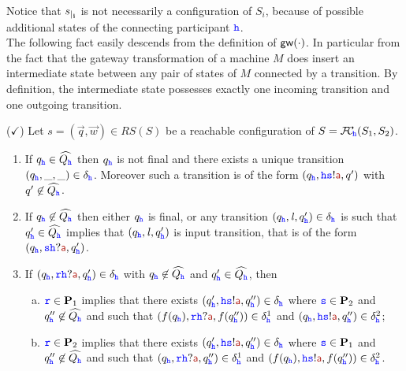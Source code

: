 Notice that ${s}_{\mid_{\mathbf{i}}}$ is not necessarily a configuration of $S_i$, because of possible additional states of the connecting participant ${\mathtt{\color{blue}{ {h}}}}$.\\


The following fact easily descends from the definition of $\mathsf{gw}(\cdot)$.
In particular from the fact that the gateway transformation of a machine $M$ does insert an intermediate state
 between any pair of states of $M$ connected by a transition. By definition, the intermediate state
 possesses exactly one incoming transition and one outgoing transition. 

\begin{fact}($\checkmark$)
\label{fact:uniquesending}
Let $s= (\vec{q},\vec{w}) \in RS(S)$ be a reachable configuration of
$S ={\mathcal{F}\!\mathcal{C}}_{\!{\mathtt{\color{blue}{ {h}}}}}(S_1,S_2)$.
\begin{enumerate}
\item
\label{fact:uniquesending-i}
If ${q_{\mathtt{\color{blue}{ {h}}}}} \in\widehat{Q_{\mathtt{\color{blue}{ {h}}}}}$ then
${q_{\mathtt{\color{blue}{ {h}}}}}$ is not final and
 there exists a unique transition $({q_{\mathtt{\color{blue}{ {h}}}}},\_,\_)\in\delta_{\mathtt{\color{blue}{ {h}}}}$.
  Moreover such a transition is of the form
 $(q_\HH,\HH\tts!\msg[a],q')$ with $q'\not\in\widehat{Q_{\mathtt{\color{blue}{ {h}}}}}$.

\item
\label{fact:uniquesending-ii}
 If ${q_{\mathtt{\color{blue}{ {h}}}}}\not\in\widehat{Q_{\mathtt{\color{blue}{ {h}}}}}$ then either $q_{\mathtt{\color{blue}{ {h}}}}$ is final, 
or any transition $({q_{\mathtt{\color{blue}{ {h}}}}},\mathit{l},q'_{\mathtt{\color{blue}{ {h}}}})\in\delta_{\mathtt{\color{blue}{ {h}}}}$ is such that 
${q'_{\mathtt{\color{blue}{ {h}}}}}\in\widehat{Q_{\mathtt{\color{blue}{ {h}}}}}$ implies that $({q_{\mathtt{\color{blue}{ {h}}}}},\mathit{l},q'_{\mathtt{\color{blue}{ {h}}}})$
is input transition, that 
is of the form $({q_\HH},\tts\HH?\msg[a],{q'_\HH})$.
\item
\label{fact:uniquesending-iii}
If $(q_\HH,\ttr\HH?\msg[a],{q'_\HH})\in\delta_\HH$ with $q_{\mathtt{\color{blue}{ {h}}}}\not\in\widehat{Q_{\mathtt{\color{blue}{ {h}}}}}$ and
$q'_{\mathtt{\color{blue}{ {h}}}}\in\widehat{Q_{\mathtt{\color{blue}{ {h}}}}}$, then
\begin{enumerate}[a)]
\item
${\mathtt{\color{blue}{ {r}}}}\in\mathbf{P}_1$ implies that
there exists $({q'_\HH},\HH\tts!\msg[a],q''_\HH)\in\delta_\HH$ where ${\mathtt{\color{blue}{ {s}}}} \in \mathbf{P}_2$ and  
$q''_{\mathtt{\color{blue}{ {h}}}}\not\in\widehat{Q_{\mathtt{\color{blue}{ {h}}}}}$ and 
such that 
$(f(q_\HH),\ttr\HH?\msg[a],f(q''_\HH))\in\delta^1_\HH$ and 
$(q_\HH,\HH\tts!\msg[a],q''_\HH)\in\delta^2_\HH$;
\item
${\mathtt{\color{blue}{ {r}}}}\in\mathbf{P}_2$ implies that
there exists $({q'_\HH},\HH\tts!\msg[a],q''_\HH)\in\delta_\HH$ where ${\mathtt{\color{blue}{ {s}}}} \in \mathbf{P}_1$ and  
$q''_{\mathtt{\color{blue}{ {h}}}}\not\in\widehat{Q_{\mathtt{\color{blue}{ {h}}}}}$ and 
such that 
$(q_\HH,\ttr\HH?\msg[a],q''_\HH)\in\delta^1_\HH$ and 
$(f(q_\HH),\HH\tts!\msg[a],f(q''_\HH))\in\delta^2_\HH$.
\end{enumerate}
\end{enumerate}
\end{fact}


